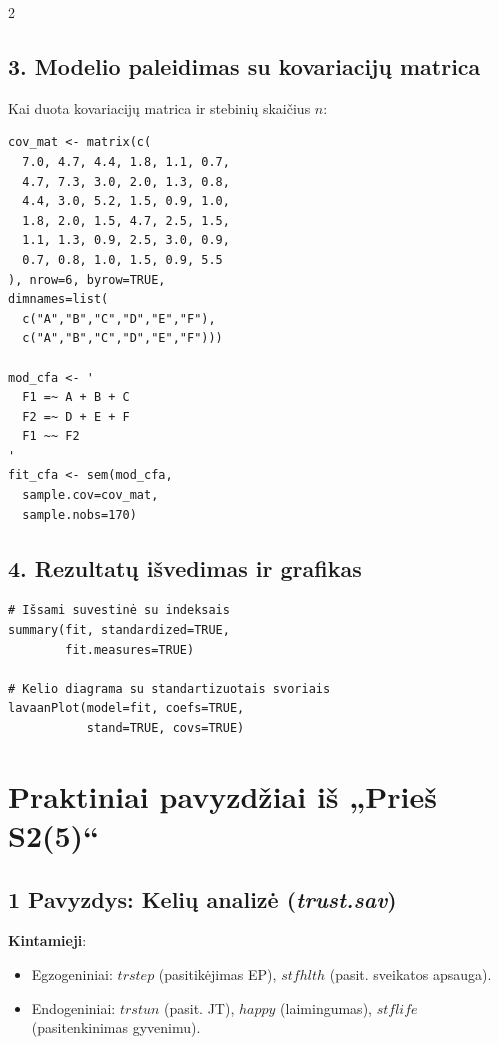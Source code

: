 \documentclass[9pt,a4paper]{article}
\begin{document}
\begin{multicols*}{2}
\subsection{3. Modelio paleidimas su kovariacijų matrica}
Kai duota kovariacijų matrica ir stebinių skaičius $n$:
\begin{footnotesize}
\begin{verbatim}
cov_mat <- matrix(c(
  7.0, 4.7, 4.4, 1.8, 1.1, 0.7,
  4.7, 7.3, 3.0, 2.0, 1.3, 0.8,
  4.4, 3.0, 5.2, 1.5, 0.9, 1.0,
  1.8, 2.0, 1.5, 4.7, 2.5, 1.5,
  1.1, 1.3, 0.9, 2.5, 3.0, 0.9,
  0.7, 0.8, 1.0, 1.5, 0.9, 5.5
), nrow=6, byrow=TRUE,
dimnames=list(
  c("A","B","C","D","E","F"),
  c("A","B","C","D","E","F")))

mod_cfa <- '
  F1 =~ A + B + C
  F2 =~ D + E + F
  F1 ~~ F2
'
fit_cfa <- sem(mod_cfa,
  sample.cov=cov_mat,
  sample.nobs=170)
\end{verbatim}
\end{footnotesize}

\subsection{4. Rezultatų išvedimas ir grafikas}
\begin{footnotesize}
\begin{verbatim}
# Išsami suvestinė su indeksais
summary(fit, standardized=TRUE,
        fit.measures=TRUE)

# Kelio diagrama su standartizuotais svoriais
lavaanPlot(model=fit, coefs=TRUE,
           stand=TRUE, covs=TRUE)
\end{verbatim}
\end{footnotesize}

\section{Praktiniai pavyzdžiai iš „Prieš S2(5)“}

\subsection{1 Pavyzdys: Kelių analizė (\textit{trust.sav})}
\textbf{Kintamieji}:
\begin{itemize}
    \item Egzogeniniai: $trstep$ (pasitikėjimas EP), $stfhlth$ (pasit. sveikatos apsauga).
    \item Endogeniniai: $trstun$ (pasit. JT), $happy$ (laimingumas), $stflife$ (pasitenkinimas gyvenimu).
\end{itemize}


\end{multicols*}
\end{document}
